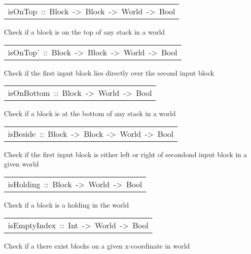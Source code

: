 \begin{haddockdesc}
\item[\begin{tabular}{@{}l}
isOnTop\ ::\ Block\ ->\ Block\ ->\ World\ ->\ Bool
\end{tabular}]\haddockbegindoc
Check if a block is on the top of any stack in a world     
\par

\end{haddockdesc}
\begin{haddockdesc}
\item[\begin{tabular}{@{}l}
isOnTop'\ ::\ Block\ ->\ Block\ ->\ World\ ->\ Bool
\end{tabular}]\haddockbegindoc
Check if the first input block lies directly over the second input block 
\par

\end{haddockdesc}
\begin{haddockdesc}
\item[\begin{tabular}{@{}l}
isOnBottom\ ::\ Block\ ->\ World\ ->\ Bool
\end{tabular}]\haddockbegindoc
Check if a block is at the bottom of any stack in a world     
\par

\end{haddockdesc}
\begin{haddockdesc}
\item[\begin{tabular}{@{}l}
isBeside\ ::\ Block\ ->\ Block\ ->\ World\ ->\ Bool
\end{tabular}]\haddockbegindoc
Check if the first input block is either left or right of secondond input block in a given world 
\par

\end{haddockdesc}
\begin{haddockdesc}
\item[\begin{tabular}{@{}l}
isHolding\ ::\ Block\ ->\ World\ ->\ Bool
\end{tabular}]\haddockbegindoc
Check if a block is a holding in the world 
\par

\end{haddockdesc}
\begin{haddockdesc}
\item[\begin{tabular}{@{}l}
isEmptyIndex\ ::\ Int\ ->\ World\ ->\ Bool
\end{tabular}]\haddockbegindoc
Check if a there exist blocks on a given x-coordinate in world 
\par

\end{haddockdesc}
